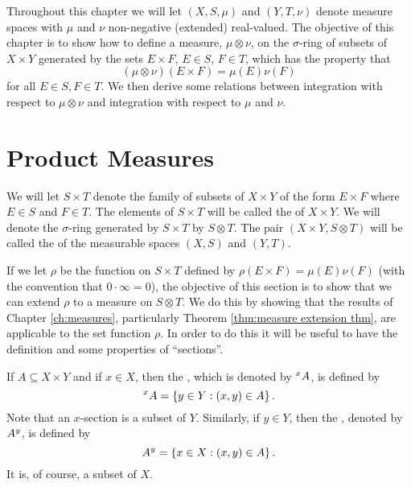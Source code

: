 

Throughout this chapter we will let $(X,S,\mu)$ and $(Y,T,\nu)$ denote measure spaces with $\mu$ and $\nu$ non-negative (extended) real-valued. The objective of this chapter is to show how to define a measure, $\mu\otimes\nu$, on the $\sigma$-ring of subsets of $X\times Y$ generated by the sets $E\times F$, $E\in S$, $F\in T$, which has the property that \[(\mu\otimes\nu)(E\times F)=\mu(E)\nu(F)\] for all $E\in S,F\in T$. We then derive some relations between integration with respect to $\mu\otimes\nu$ and integration with respect to $\mu$ and $\nu$.

\section{Product Measures}

\begin{definition}
We will let $S\times T$ denote the family of subsets of $X\times Y$ of the form $E\times F$ where $E\in S$ and $F\in T$. The elements of $S\times T$ will be called the  of $X\times Y$. We will denote the $\sigma$-ring generated by $S\times T$ by $S\otimes T$. The pair $(X\times Y,S\otimes T)$ will be called the  of the measurable spaces $(X,S)$ and $(Y,T)$.
\end{definition}

If we let $\rho$ be the function on $S\times T$ defined by $\rho(E\times F)=\mu(E)\nu(F)$ (with the convention that $0\cdot\infty=0$), the objective of this section is to show that we can extend $\rho$ to a measure on $S\otimes T$. We do this by showing that the results of Chapter \ref{ch:measures}, particularly Theorem \ref{thm:measure extension thm}, are applicable to the set function $\rho$. In order to do this it will be useful to have the definition and some properties of ``sections''.

\begin{definition}
If $A\subseteq X\times Y$ and if $x\in X$, then the , which is denoted by $\xsec{A}{x}$, is defined by \[\xsec{A}{x}=\brc{y\in Y:(x,y)\in A}.\] Note that an $x$-section is a subset of $Y$. Similarly, if $y\in Y$, then the , denoted by $\ysec{A}{y}$, is defined by \[\ysec{A}{y}=\brc{x\in X:(x,y)\in A}.\] It is, of course, a subset of $X$.
\end{definition}

